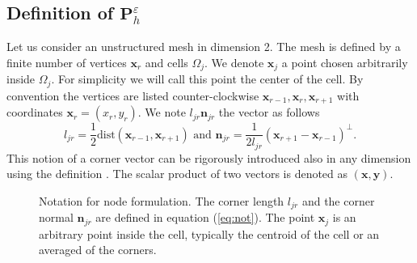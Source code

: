 \documentclass[a4paper,french,english,10pt]{article}
\newcommand\njr{\mathbf{n}_{jr}}
\newcommand\eps{\varepsilon}
\newcommand\x{\mathbf{x}}
\newcommand\xj{\mathbf{x}_j}
\newcommand\xr{\mathbf{x}_r}
\begin{document}
\subsection{Definition of $\mathbf P_h^\eps$}


Let us consider an unstructured mesh in dimension 2. The mesh is defined
by a finite number of vertices $\xr$ and cells $\Omega_{j}$. We
denote $\xj$ a point  chosen arbitrarily inside $\Omega_j$.
For simplicity we will call this point the center of the cell.
 By convention the vertices
are listed counter-clockwise $\x_{r-1},\xr,\x_{r+1}$
with
coordinates $\xr=(x_{r},y_{r})$. 
We note  $l_{jr}\njr$ the vector as follows
\begin{equation}\label{eq:not}
l_{jr}=\frac12 \mbox{dist}\left( \x_{r-1},\x_{r+1}\right) 
\mbox{ and }
\njr=\frac{1}{2l_{jr}}\left(
\x_{r+1}-\x_{r-1}
\right)^\perp.
\end{equation}
This notion of a corner vector can be rigorously  introduced  also in any dimension
using the  definition \cite{de10}.
The scalar product of two vectors is denoted as
$(\x,\mathbf{y})$.

\begin{figure}[ht!]
\begin{center}
\end{center}

\caption{Notation for node formulation. The corner length $l_{jr}$ 
and the corner normal $\njr$ are defined in equation (\ref{eq:not}).
The point $\x_j$ is an arbitrary point inside the cell, typically
the centroid of the cell or an averaged of the corners.
}
\end{figure}
\end{document}
